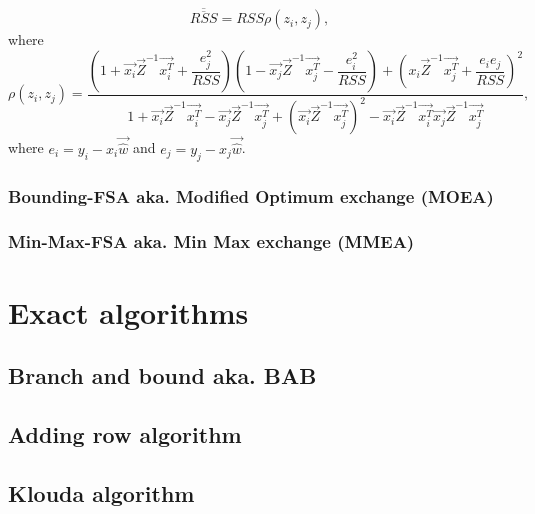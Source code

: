 \begin{equation}
	\overline{\overline{RSS}}  = RSS\rho(z_i, z_j),
\end{equation}
where
\begin{equation}
	\rho(z_i, z_j) =
	 \dfrac
	 {(1+\vec{x_i}\vec{Z}^{-1}\vec{x_i^T} + \dfrac{e_j^2}{RSS})
		(1 - \vec{x_j}\vec{Z}^{-1}\vec{x_j^T} - \dfrac{e_i^2}{RSS} )+
		({x_i}\vec{Z}^{-1}\vec{x_j^T} + \dfrac{e_i e_j}{RSS} )^2}
	{1 + \vec{x_i}\vec{Z}^{-1}\vec{x_i^T}  - \vec{x_j}\vec{Z}^{-1}\vec{x_j^T}  + ( \vec{x_i}\vec{Z}^{-1}\vec{x_j^T})^2 -   \vec{x_i}\vec{Z}^{-1}\vec{x_i^T}\vec{x_j}\vec{Z}^{-1}\vec{x_j^T} },
\end{equation}
where $e_i = y_i - x_i\vec{\hat{w}}$ and $e_j = y_j - x_j\vec{\hat{w}}$.





\subsection{Bounding-FSA aka. Modified Optimum exchange (MOEA)}
\subsection{Min-Max-FSA aka. Min Max exchange (MMEA)}




\chapter{Exact algorithms} %

\section{Branch and bound aka. BAB}  %
\section{Adding row algorithm} %
\section{Klouda algorithm}
